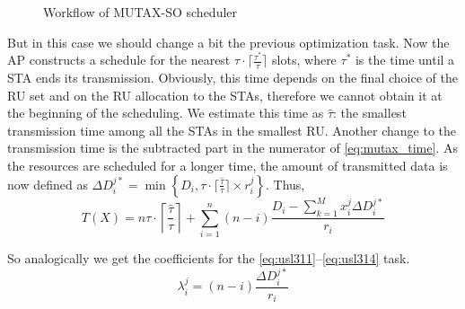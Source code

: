 \begin{figure}[tb]
\begin{scaletikzpicturetowidth}{\columnwidth}
	\end{scaletikzpicturetowidth}
	\caption{\label{fig:mutexso} Workflow of MUTAX-SO scheduler}		
\end{figure}

But in this case we should change a bit the previous optimization task.
Now the AP constructs a schedule for the nearest $\tau\cdot\lceil\frac{\tau^*}{\tau}\rceil$ slots, where $\tau^*$ is the time until a STA ends its transmission.
Obviously, this time depends on the final choice of the RU set and on the RU allocation to the STAs, therefore we cannot obtain it at the beginning of the scheduling.
We estimate this time as $\hat{\tau}$: the smallest transmission time among all the STAs in the smallest RU.
Another change to the transmission time is the subtracted part in the numerator of \eqref{eq:mutax_time}.
As the resources are scheduled for a longer time, the amount of transmitted data is now defined as $\Delta D_i^{j*} = \min\left\{D_i, \tau\cdot\lceil\frac{\hat \tau}{\tau}\rceil \times r_{i}^{j}\right\}$.
Thus,
\begin{equation}
\label{eq:timesrtfso}
T\left(X\right) = n \tau \cdot\left\lceil\frac{\hat \tau}{\tau}\right\rceil + \sum_{i = 1}^{n} \left(n - i\right) \frac{D_i -  \sum_{k = 1}^{M} x_i^j \Delta D_i^{j*}}{r_{i}}
\end{equation}

So analogically we get the coefficients for the \eqref{eq:usl311}--\eqref{eq:usl314} task.
\begin{equation}
\label{eq:lambdasrtfso}
\lambda_i^j = \left(n - i\right) \frac{\Delta D_i^{j*}}{r_{i}}
\end{equation}

